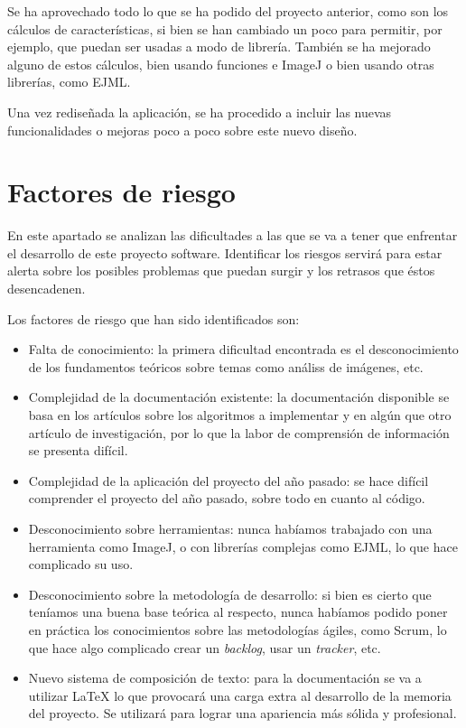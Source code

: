 Se ha aprovechado todo lo que se ha podido del proyecto anterior, como son los cálculos de características, si bien se han cambiado un poco para permitir, por ejemplo, que puedan ser usadas a modo de librería. También se ha mejorado alguno de estos cálculos, bien usando funciones e ImageJ o bien usando otras librerías, como EJML.

Una vez rediseñada la aplicación, se ha procedido a incluir las nuevas funcionalidades o mejoras poco a poco sobre este nuevo diseño.

\newpage

\section{Factores de riesgo}
En este apartado se analizan las dificultades a las que se va a tener que enfrentar el desarrollo de este proyecto software. Identificar los riesgos servirá para estar alerta sobre los posibles problemas que puedan surgir y los retrasos que éstos desencadenen.

Los factores de riesgo que han sido identificados son:
\begin{itemize}
 \item Falta de conocimiento: la primera dificultad encontrada es el desconocimiento de los fundamentos teóricos sobre temas como análiss de imágenes, etc. 
 \item Complejidad de la documentación existente: la documentación disponible se basa en los artículos sobre los algoritmos a implementar y en algún que otro artículo de investigación, por lo que la labor de comprensión de información se presenta difícil.
 \item Complejidad de la aplicación del proyecto del año pasado: se hace difícil comprender el proyecto del año pasado, sobre todo en cuanto al código.
 \item Desconocimiento sobre herramientas: nunca habíamos trabajado con una herramienta como ImageJ, o con librerías complejas como EJML, lo que hace complicado su uso.
 \item Desconocimiento sobre la metodología de desarrollo: si bien es cierto que teníamos una buena base teórica al respecto, nunca habíamos podido poner en práctica los conocimientos sobre las metodologías ágiles, como Scrum, lo que hace algo complicado crear un \textit{backlog}, usar un \textit{tracker}, etc.
 \item Nuevo sistema de composición de texto: para la documentación se va a utilizar \LaTeX{} lo que provocará una carga extra al desarrollo de la memoria del proyecto. Se utilizará para lograr una apariencia más sólida y profesional.
\end{itemize}

